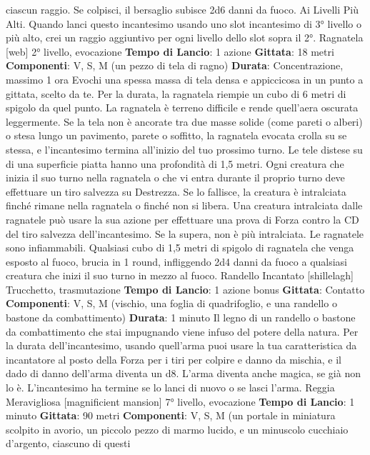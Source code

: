 \begin{multicols}{2}
ciascun raggio. Se colpisci, il bersaglio subisce 2d6
danni da fuoco.
Ai Livelli Più Alti. Quando lanci questo incantesimo
usando uno slot incantesimo di 3° livello o più alto, crei
un raggio aggiuntivo per ogni livello dello slot sopra il
2°.
Ragnatela
[web]
2° livello, evocazione
\textbf{Tempo di Lancio}: 1 azione
\textbf{Gittata}: 18 metri
\textbf{Componenti}: V, S, M (un pezzo di tela di ragno)
\textbf{Durata}: Concentrazione, massimo 1 ora
Evochi una spessa massa di tela densa e appiccicosa
in un punto a gittata, scelto da te. Per la durata, la
ragnatela riempie un cubo di 6 metri di spigolo da quel
punto. La ragnatela è terreno difficile e rende quell’aera
oscurata leggermente.
Se la tela non è ancorate tra due masse solide (come
pareti o alberi) o stesa lungo un pavimento, parete o
soffitto, la ragnatela evocata crolla su se stessa, e
l’incantesimo termina all’inizio del tuo prossimo turno.
Le tele distese su di una superficie piatta hanno una
profondità di 1,5 metri.
Ogni creatura che inizia il suo turno nella ragnatela o
che vi entra durante il proprio turno deve effettuare un
tiro salvezza su Destrezza. Se lo fallisce, la creatura è
intralciata finché rimane nella ragnatela o finché non si
libera.
Una creatura intralciata dalle ragnatele può usare la
sua azione per effettuare una prova di Forza contro la
CD del tiro salvezza dell’incantesimo. Se la supera, non
è più intralciata.
Le ragnatele sono infiammabili. Qualsiasi cubo di 1,5
metri di spigolo di ragnatela che venga esposto al
fuoco, brucia in 1 round, infliggendo 2d4 danni da fuoco
a qualsiasi creatura che inizi il suo turno in mezzo al
fuoco.
Randello Incantato
[shillelagh]
Trucchetto, trasmutazione
\textbf{Tempo di Lancio}: 1 azione bonus
\textbf{Gittata}: Contatto
\textbf{Componenti}: V, S, M (vischio, una foglia di
quadrifoglio, e una randello o bastone da
combattimento)
\textbf{Durata}: 1 minuto
Il legno di un randello o bastone da combattimento che
stai impugnando viene infuso del potere della natura.
Per la durata dell’incantesimo, usando quell’arma puoi
usare la tua caratteristica da incantatore al posto della
Forza per i tiri per colpire e danno da mischia, e il dado
di danno dell’arma diventa un d8. L’arma diventa anche
magica, se già non lo è. L’incantesimo ha termine se lo
lanci di nuovo o se lasci l’arma.
Reggia Meravigliosa
[magnificient mansion]
7° livello, evocazione
\textbf{Tempo di Lancio}: 1 minuto
\textbf{Gittata}: 90 metri
\textbf{Componenti}: V, S, M (un portale in miniatura scolpito
in avorio, un piccolo pezzo di marmo lucido, e un
minuscolo cucchiaio d’argento, ciascuno di questi

\end{multicols}
